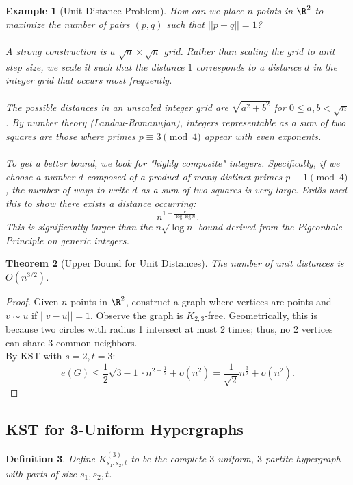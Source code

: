 \documentclass[a4paper]{article}
\newtheorem{thm}{Theorem}[section]
\newtheorem{defn}[thm]{Definition}
\newtheorem{eg}[thm]{Example}
\begin{document}
\begin{eg}[Unit Distance Problem]
    How can we place $n$ points in $\R^2$ to maximize the number of pairs $(p,q)$ such that $||p-q||=1$?\\\\
    A strong construction is a $\sqrt{n}\times \sqrt{n}$ grid. Rather than scaling the grid to unit step size, we scale it such that the distance $1$ corresponds to a distance $d$ in the integer grid that occurs most frequently.\\\\
    The possible distances in an unscaled integer grid are $\sqrt{a^2+b^2}$ for $0 \le a,b < \sqrt{n}$. By number theory (Landau-Ramanujan), integers representable as a sum of two squares are those where primes $p \equiv 3 \pmod 4$ appear with even exponents.\\\\
    To get a better bound, we look for "highly composite" integers. Specifically, if we choose a number $d$ composed of a product of many distinct primes $p \equiv 1 \pmod 4$, the number of ways to write $d$ as a sum of two squares is very large. Erd\H{o}s used this to show there exists a distance occurring:
    \[
    n^{1 + \frac{c}{\log \log n}}.
    \]
    This is significantly larger than the $n\sqrt{\log n}$ bound derived from the Pigeonhole Principle on generic integers.
\end{eg}

\begin{thm}[Upper Bound for Unit Distances]
    The number of unit distances is $O(n^{3/2})$.
\end{thm}
\begin{proof}
        Given $n$ points in $\R^2$, construct a graph where vertices are points and $v\sim u$ if $||v-u||= 1$.
        Observe the graph is $K_{2,3}$-free. Geometrically, this is because two circles with radius 1 intersect at most 2 times; thus, no 2 vertices can share 3 common neighbors.\\
        By KST with $s=2, t=3$:
        \[ e(G) \leq \frac{1}{2}\sqrt{3-1} \cdot n^{2-\frac{1}{2}} + o(n^2) = \frac{1}{\sqrt{2}}n^{\frac{3}{2}} + o(n^2). \]
\end{proof}

\subsection{KST for 3-Uniform Hypergraphs}

\begin{defn}
    Define $K_{s_1,s_2,t}^{(3)}$ to be the complete $3$-uniform, $3$-partite hypergraph with parts of size $s_1, s_2, t$.
\end{defn}
\end{document}
